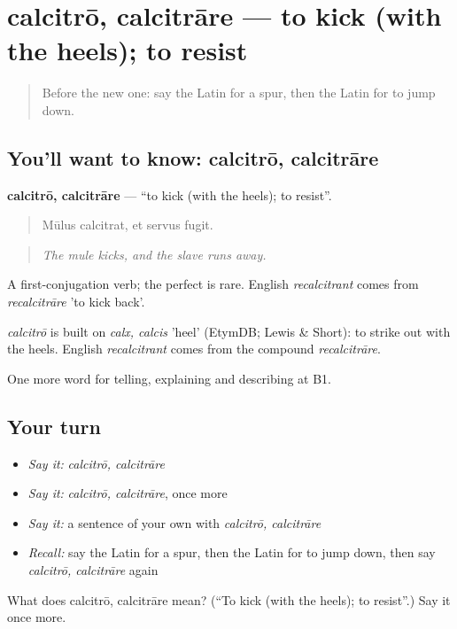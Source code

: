 \section[calcitrō, calcitrāre]{calcitrō, calcitrāre — to kick (with the heels); to resist}

\label{lesson:LA-C432-calcitro}



\begin{quote}
Before the new one: say the Latin for a spur, then the Latin for to jump down.
\end{quote}

\subsection*{You'll want to know: calcitrō, calcitrāre}
\textbf{calcitrō, calcitrāre} — \textquotedblleft{}to kick (with the heels); to resist\textquotedblright{}.

\begin{quote}
Mūlus calcitrat, et servus fugit.
\end{quote}

\begin{quote}
\emph{The mule kicks, and the slave runs away.}
\end{quote}

A first-conjugation verb; the perfect is rare. English \emph{recalcitrant} comes from \emph{recalcitrāre} 'to kick back'.

\begin{cousinweb}
\emph{calcitrō} is built on \emph{calx, calcis} 'heel' (EtymDB; Lewis \& Short): to strike out with the heels. English \emph{recalcitrant} comes from the compound \emph{recalcitrāre}.
\end{cousinweb}

\begin{grammarlens}[title={What you've built}]
One more word for telling, explaining and describing at B1.
\end{grammarlens}

\subsection*{Your turn}
\begin{itemize}
\raggedright
  \item \emph{Say it:} \emph{calcitrō, calcitrāre}
  \item \emph{Say it:} \emph{calcitrō, calcitrāre}, once more
  \item \emph{Say it:} a sentence of your own with \emph{calcitrō, calcitrāre}
  \item \emph{Recall:} say the Latin for a spur, then the Latin for to jump down, then say \emph{calcitrō, calcitrāre} again
\end{itemize}

\begin{tcolorbox}[breakable,colback=teal!4,colframe=teal!35!black,title={Before you move on}]
What does calcitrō, calcitrāre mean? (\textquotedblleft{}To kick (with the heels); to resist\textquotedblright{}.) Say it once more.
\end{tcolorbox}
